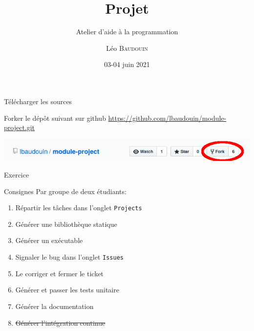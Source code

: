 \documentclass{beamer}
\title{Projet}
\subtitle{Atelier d'aide à la programmation}
\author{L\'eo \textsc{Baudouin}}
\institute{
  {\url{baudouin.leo @ gmail.com}}
}
\date{03-04 juin 2021}
\begin{document}
\begin{frame}
  \titlepage
\end{frame}


\section{}
\subsection{}

\begin{frame}[fragile]{Télécharger les sources}
  \begin{block}{Forker le dép\^ot suivant sur github}
    \url{https://github.com/lbaudouin/module-project.git}
  \end{block}
  
\includegraphics[width=\linewidth]{images/fork.png}  
  
\end{frame}

\begin{frame}[fragile]{Exercice}  
    \begin{exampleblock}{Consignes}
	Par groupe de deux étudiants:
    \begin{enumerate}
    \item Répartir les tâches dans l'onglet \verb?Projects?
    \item Générer une bibliothèque statique
    \item Générer un exécutable
    \item Signaler le bug dans l'onglet \verb?Issues?
    \item Le corriger et fermer le ticket
    \item Générer et passer les tests unitaire
    \item Générer la documentation
    \item \sout{Générer l'intégration continue}
    \end{enumerate}
  \end{exampleblock}
\end{frame}

\end{document}
